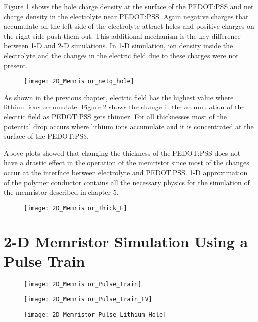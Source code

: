 \begin{doublespace}
Figure \ref{thick_netq_p} shows the hole charge density at the surface of the PEDOT:PSS and net charge density in the electrolyte near PEDOT:PSS. Again negative charges that accumulate on the left side of the electrolyte attract holes and positive charges on the right side push them out. This additional mechanism is the key difference between 1-D and 2-D simulations. In 1-D simulation, ion density inside the electrolyte and the changes in the electric field due to these charges were not present.

\begin{figure}[!htp]
\centering
\texttt{[image: 2D\_Memristor\_netq\_hole]}
\caption{} 
\label{thick_netq_p}
\end{figure}

As shown in the previous chapter, electric field has the highest value where lithium ions accumulate. Figure \ref{thick_efield} shows the change in the accumulation of the electric field as PEDOT:PSS gets thinner. For all thicknesses most of the potential drop occurs where lithium ions accumulate and it is concentrated at the surface of the PEDOT:PSS. 

Above plots showed that changing the thickness of the PEDOT:PSS does not have a drastic effect in the operation of the memristor since most of the changes occur at the interface between electrolyte and PEDOT:PSS. 1-D approximation of the polymer conductor contains all the necessary physics for the simulation of the memristor described in chapter 5.

\begin{figure}[!htp]
\centering
\texttt{[image: 2D\_Memristor\_Thick\_E]}
\caption{} 
\label{thick_efield}
\end{figure}


\clearpage
\section{2-D Memristor Simulation Using a Pulse Train}

\begin{figure}[!htp]
\centering
\texttt{[image: 2D\_Memristor\_Pulse\_Train]}
\caption{} 
\label{}
\end{figure}


\begin{figure}[!htp]
\centering
\texttt{[image: 2D\_Memristor\_Pulse\_Train\_EV]}
\caption{} 
\label{}
\end{figure}

\begin{figure}[!htp]
\centering
\texttt{[image: 2D\_Memristor\_Pulse\_Lithium\_Hole]}
\caption{} 
\label{}
\end{figure}


\end{doublespace}
